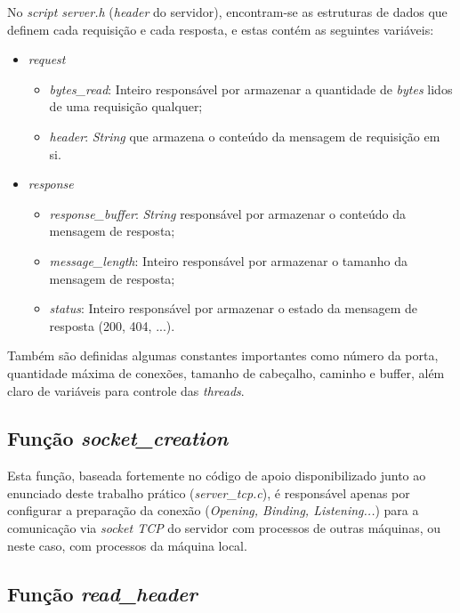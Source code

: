 \documentclass[a4paper, 12pt]{article}
\begin{document}
No \emph{script server.h} (\emph{header} do servidor), encontram-se as estruturas de dados que definem cada requisição e cada resposta, e estas contém as seguintes variáveis:

\begin{itemize}
    \item \emph{request}
    \begin{itemize}
        \item \emph{bytes\_read}: Inteiro responsável por armazenar a quantidade de \emph{bytes} lidos de uma requisição qualquer;
        \item \emph{header}: \emph{String} que armazena o conteúdo da mensagem de requisição em si.
    \end{itemize}
    \item \emph{response}
    \begin{itemize}
        \item \emph{response\_buffer}: \emph{String} responsável por armazenar o conteúdo da mensagem de resposta;
        \item \emph{message\_length}: Inteiro responsável por armazenar o tamanho da mensagem de resposta;
        \item \emph{status}: Inteiro responsável por armazenar o estado da mensagem de resposta (200, 404, ...).
    \end{itemize}
\end{itemize}

Também são definidas algumas constantes importantes como número da porta, quantidade máxima de conexões, tamanho de cabeçalho, caminho e buffer, além claro de variáveis para controle das \emph{threads}.

\subsection{Função \emph{socket\_creation}}

Esta função, baseada fortemente no código de apoio disponibilizado junto ao enunciado deste trabalho prático (\emph{server\_tcp.c}), é responsável apenas por configurar a preparação da conexão (\emph{Opening, Binding, Listening...}) para a comunicação via \emph{socket TCP} do servidor com processos de outras máquinas, ou neste caso, com processos da máquina local.

\subsection{Função \emph{read\_header}}
\end{document}
